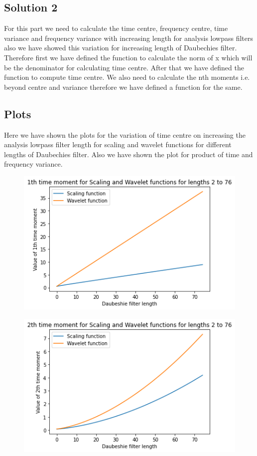 \documentclass{article}
\begin{document}
\subsection{Solution 2}

For this part we need to calculate the time centre, frequency centre, time variance and frequency variance with increasing length for analysis lowpass filters also we have showed this variation for increasing length of Daubechies filter. Therefore first we have defined the function to calculate the norm of x which will be the denominator for calculating time centre. After that we have defined the function to compute time centre. We also need to calculate the nth moments i.e. beyond centre and variance therefore we have defined a function for the same.

\subsection{Plots}

Here we have shown the plots for the variation of time centre on increasing the analysis lowpass filter length for scaling and wavelet functions for different lengths of Daubechies filter. Also we have shown the plot for product of time and frequency variance.

\begin{figure}[H]
\begin{center}
\includegraphics[scale = 0.8]{1th.png}
\end{center}
\end{figure}

\begin{figure}[H]
\begin{center}
\includegraphics[scale = 0.8]{2nd.png}
\end{center}
\end{figure}
\end{document}

